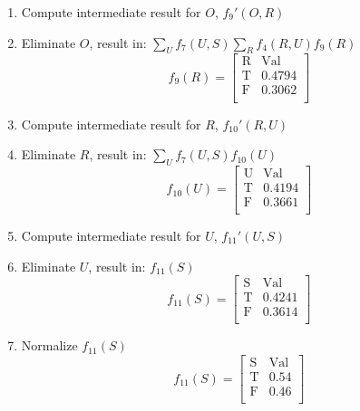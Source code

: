 \documentclass{article}
\newcommand{\mat}[1]{\begin{bmatrix}#1\end{bmatrix}}
\begin{document}
\begin{enumerate}[label=\arabic*.]
{\begin{enumerate}[label=\arabic*.]
\[{                    \text{F} & \text{T} & 0.76 \\
                    \text{F} & \text{F} & 0.66 \\
                }
            \]
            \item Compute intermediate result for $O$, $f_9'(O,R)$
            \item Eliminate $O$, result in: $\sum_U f_7(U,S) \sum_R f_4(R,U) f_9(R)$
            \[
                f_9(R) = \mat{
                    \text{R} & \text{Val} \\
                    \text{T} & 0.4794 \\
                    \text{F} & 0.3062 \\
                }
            \]
            \item Compute intermediate result for $R$, $f_{10}'(R,U)$
            \item Eliminate $R$, result in: $\sum_U f_7(U,S) f_{10}(U)$
            \[
                f_{10}(U) = \mat{
                    \text{U} & \text{Val} \\
                    \text{T} & 0.4194 \\
                    \text{F} & 0.3661 \\
                }
            \]
            \item Compute intermediate result for $U$, $f_{11}'(U,S)$
            \item Eliminate $U$, result in: $f_{11}(S)$
            \[
                f_{11}(S) = \mat{
                    \text{S} & \text{Val} \\
                    \text{T} & 0.4241 \\
                    \text{F} & 0.3614 \\
                }
            \]
            \item Normalize $f_{11}(S)$
            \[
                f_{11}(S) = \mat{
                    \text{S} & \text{Val} \\
                    \text{T} & 0.54 \\
                    \text{F} & 0.46 \\
                }
            \]
        \end{enumerate}
    }
\end{enumerate}
\end{document}
